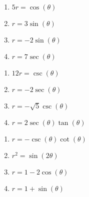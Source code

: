 \documentclass{ximera}
\begin{document}
\begin{multicols}{4} 

\begin{enumerate}

\setcounter{enumi}{\value{HW}}

\item $5r = \cos(\theta)$
\item $r = 3\sin(\theta)$
\item $r = -2\sin(\theta)$ 
\item $r = 7\sec(\theta)$

\setcounter{HW}{\value{enumi}}

\end{enumerate}

\end{multicols}

\begin{multicols}{4} 

\begin{enumerate}

\setcounter{enumi}{\value{HW}}

\item $12r = \csc(\theta)$
\item $r = -2\sec(\theta)$
\item $r = -\sqrt{5} \csc(\theta)$ 
\item \small $r = 2\sec(\theta)\tan(\theta)$ \normalsize

\setcounter{HW}{\value{enumi}}

\end{enumerate}

\end{multicols}

\begin{multicols}{4} 

\begin{enumerate}

\setcounter{enumi}{\value{HW}}

\item \small $r = -\csc(\theta) \cot(\theta)$ \normalsize
\item $r^{2} = \sin(2\theta)$
\item $r = 1 - 2\cos(\theta)$
\item $r = 1 + \sin(\theta)$ \label{equpolartorectlast}

\setcounter{HW}{\value{enumi}}

\end{enumerate}

\end{multicols}
\end{document}
